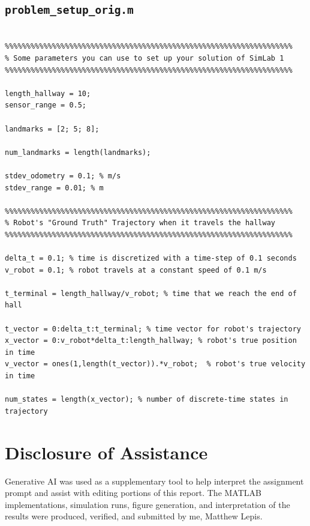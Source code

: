 \documentclass[11pt]{article}
\begin{document}
\subsection*{\texttt{problem\_setup\_orig.m}}
\begin{lstlisting}[caption={problem\_setup\_orig.m}, label={lst:problemsetup}]

%%%%%%%%%%%%%%%%%%%%%%%%%%%%%%%%%%%%%%%%%%%%%%%%%%%%%%%%%%%%%%%%%%%
% Some parameters you can use to set up your solution of SimLab 1
%%%%%%%%%%%%%%%%%%%%%%%%%%%%%%%%%%%%%%%%%%%%%%%%%%%%%%%%%%%%%%%%%%%

length_hallway = 10;
sensor_range = 0.5;

landmarks = [2; 5; 8];

num_landmarks = length(landmarks);

stdev_odometry = 0.1; % m/s
stdev_range = 0.01; % m

%%%%%%%%%%%%%%%%%%%%%%%%%%%%%%%%%%%%%%%%%%%%%%%%%%%%%%%%%%%%%%%%%%%
% Robot's "Ground Truth" Trajectory when it travels the hallway 
%%%%%%%%%%%%%%%%%%%%%%%%%%%%%%%%%%%%%%%%%%%%%%%%%%%%%%%%%%%%%%%%%%%

delta_t = 0.1; % time is discretized with a time-step of 0.1 seconds
v_robot = 0.1; % robot travels at a constant speed of 0.1 m/s

t_terminal = length_hallway/v_robot; % time that we reach the end of hall

t_vector = 0:delta_t:t_terminal; % time vector for robot's trajectory
x_vector = 0:v_robot*delta_t:length_hallway; % robot's true position in time
v_vector = ones(1,length(t_vector)).*v_robot;  % robot's true velocity in time

num_states = length(x_vector); % number of discrete-time states in trajectory
\end{lstlisting}

\section*{Disclosure of Assistance}
Generative AI was used as a supplementary tool to help interpret the assignment prompt
and assist with editing portions of this report. The MATLAB implementations, simulation
runs, figure generation, and interpretation of the results were produced,
verified, and submitted by me, Matthew Lepis.
\end{document}
